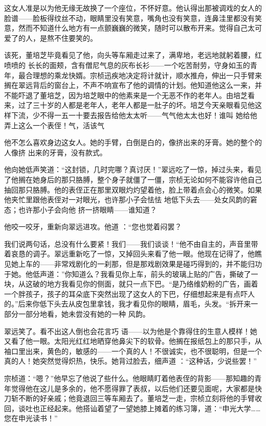 \documentclass{article}
\begin{document}
    这女人准是以为他无缘无故换了一个座位，不怀好意。他认得出那被调戏的女人的脸谱——脸板得纹丝不动，眼睛里没有笑意，嘴角也没有笑意，连鼻洼里都没有笑意，然而不知道什么地方有一点颤巍巍的微笑，随时可以散布开来。觉得自己太可
爱了的人，是熬不住要笑的。 

    该死，董培芝毕竟看见了他，向头等车厢走过来了，满卑地，老远地就躬着腰，红喷喷的
\newpage
长长的面颊，含有僧尼气息的灰布长衫——一个吃苦耐劳，守身如玉的青年，最合理想的乘龙快婿。宗桢迅疾地决定将计就计，顺水推舟，伸出一只手臂来搁在翠远背后的窗台上，不声不响宣布了他的调情的计划。他知道他这么一来，并不能吓退了董培芝，因为培芝眼中的他素来是一个无恶不作的老年人。由培芝看来，过了三十岁的人都是老年人，老年人都是一肚子的坏。培芝今天亲眼看见他这样下流，少不得一五一十要去报告给他太太听——气气他太太也好！谁叫
她给他弄上这么一个表侄！气，活该气 

    他不怎么喜欢身边这女人。她的手臂，白倒是白的，像挤出来的牙膏。她的整个的人像挤
出来的牙膏，没有款式。 

    他向她低声笑道：“这封锁，几时完哪？真讨厌！”翠远吃了一惊，掉过头来，看见了他搁在她身后的那只胳膊，整个身子就僵了一僵，宗桢无论如何不能容许他自己抽回那只胳膊。他的表侄正在那里双眼灼灼望着他，脸上带着点会心的微笑。如果他夹忙里跟他表侄对一对眼光，也许那小子会怯怯
\newpage
地低下头去——处女风韵的窘态；也许那小子会向他
挤一挤眼睛——谁知道？ 

    他咬一咬牙，重新向翠远进攻。他道
：“您也觉着闷罢？ 

    我们说两句话，总没有什么要紧！我们——我们谈谈！“他不由自主的，声音里带着哀恳的调子。翠远重新吃了一惊，又掉回头来看了他一眼。他现在记得了，他瞧见她上车的——非常戏剧化的一刹那，但是那戏剧效果是碰巧得到的，并不能归功于她。他低声道：”你知道么？我看见你上车，前头的玻璃上贴的广告，撕破了一块，从这破的地方我看见你的侧面，就只一点下巴。“是乃络维奶粉的广告，画着一个胖孩子，孩子的耳朵底下突然出现了这女人的下巴，仔细想起来是有点吓人的。”后来你低下头去从皮包里拿钱，我才看见你的眼睛，眉毛，头发。“拆开来一部分一部分地看，她未尝没有她的一种
风韵。 

    翠远笑了。看不出这人倒也会花言巧
\newpage
语——以为他是个靠得住的生意人模样！她又看了他一眼。太阳光红红地晒穿他鼻尖下的软骨。他搁在报纸包上的那只手，从袖口里出来，黄色的，敏感的——一个真的人！不很诚实，也不很聪明，但是一个真的人！她突然觉得炽热，快乐。她背过脸去，细声道
：“这种话，少说些罢！” 


    宗桢道：“嗯？”他早忘了他说了些什么。他眼睛盯着他表侄的背影——那知趣的青年觉得他在这儿是多余的，他不愿得罪了表叔，以后他们还要见面呢，大家都是快刀斩不断的好亲戚；他竟退回三等车厢去了。董培芝一走，宗桢立刻将他的手臂收回，谈吐也正经起来。他搭讪着望了一望她膝上摊着的练习簿，道：“申光大学……您在申光读书！”
\end{document}
